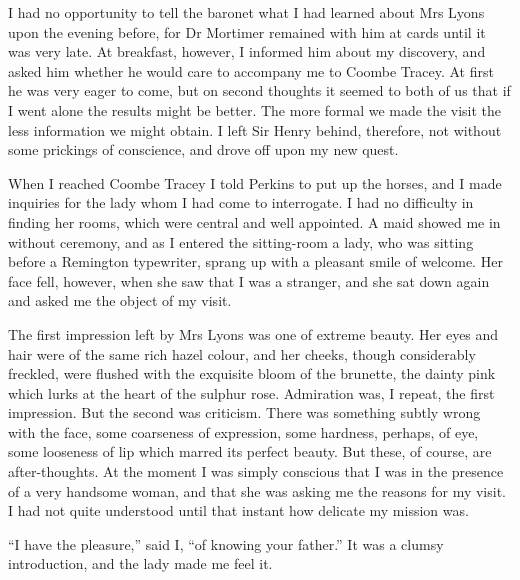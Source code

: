 \documentclass[paper=a5,BCOR=7mm,twoside,DIV=calc,12pt,usegeometry,openany,chapterprefix,endperiod,headings=big]{scrbook} %
\begin{document}
I had no opportunity to tell the baronet what I had learned about Mrs Lyons upon the evening before, for Dr Mortimer remained with him at cards until it was very late. At breakfast, however, I informed him about my discovery, and asked him whether he would care to accompany me to Coombe Tracey. At first he was very eager to come, but on second thoughts it seemed to both of us that if I went alone the results might be better. The more formal we made the visit the less information we might obtain. I left Sir Henry behind, therefore, not without some prickings of conscience, and drove off upon my new quest.

When I reached Coombe Tracey I told Perkins to put up the horses, and I made inquiries for the lady whom I had come to interrogate. I had no difficulty in finding her rooms, which were central and well appointed. A maid showed me in without ceremony, and as I entered the sitting-room a lady, who was sitting before a Remington typewriter, sprang up with a pleasant smile of welcome. Her face fell, however, when she saw that I was a stranger, and she sat down again and asked me the object of my visit.

The first impression left by Mrs Lyons was one of extreme beauty. Her eyes and hair were of the same rich hazel colour, and her cheeks, though considerably freckled, were flushed with the exquisite bloom of the brunette, the dainty pink which lurks at the heart of the sulphur rose. Admiration was, I repeat, the first impression. But the second was criticism. There was something subtly wrong with the face, some coarseness of expression, some hardness, perhaps, of eye, some looseness of lip which marred its perfect beauty. But these, of course, are after-thoughts. At the moment I was simply conscious that I was in the presence of a very handsome woman, and that she was asking me the reasons for my visit. I had not quite understood until that instant how delicate my mission was.

\enquote{I have the pleasure,} said I, \enquote{of knowing your father.} It was a clumsy introduction, and the lady made me feel it.
\end{document}
